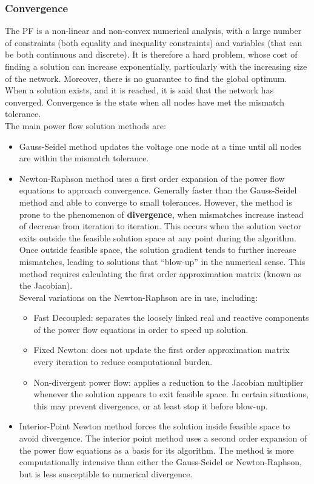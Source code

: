 \subsubsection{Convergence}
The \gls{PF} is a non-linear and non-convex numerical analysis, with a large number of constraints (both equality and inequality constraints) and variables (that can be both continuous and discrete). It is therefore a hard problem, whose cost of finding a solution can increase exponentially, particularly with the increasing size of the network. Moreover, there is no guarantee to find the global optimum. \\
When a solution exists, and it is reached, it is said that the network has converged. Convergence is the state when all nodes have met the mismatch tolerance. \\
The main power flow solution methods are:
\begin{itemize}
    \item Gauss-Seidel method updates the voltage one node at a time until all nodes are within the mismatch tolerance.
    
    \item Newton-Raphson method uses a first order expansion of the power flow equations to approach convergence. Generally faster than the Gauss-Seidel method and able to converge to small tolerances. However, the method is prone to the phenomenon of \textbf{divergence}, when mismatches increase instead of decrease from iteration to iteration. This occurs when the solution vector exits outside the feasible solution space at any point during the algorithm. Once outside feasible space, the solution gradient tends to further increase mismatches, leading to solutions that “blow-up” in the numerical sense. This method requires calculating the first order approximation matrix (known as the Jacobian). \\
    Several variations on the Newton-Raphson are in use, including:
        \begin{itemize}
            \item[] Fast Decoupled: separates the loosely linked real and reactive components of the power flow equations in order to speed up solution.
            \item[] Fixed Newton: does not update the first order approximation matrix every iteration to reduce computational burden.
            \item[] Non-divergent power flow: applies a reduction to the Jacobian multiplier whenever the solution appears to exit feasible space. In certain situations, this may prevent divergence, or at least stop it before blow-up.
        \end{itemize}
    \item Interior-Point Newton method forces the solution inside feasible space to avoid divergence. The interior point method uses a second order expansion of the power flow equations as a basis for its algorithm. The method is more computationally intensive than either the Gauss-Seidel or Newton-Raphson, but is less susceptible to numerical divergence.
\end{itemize}

